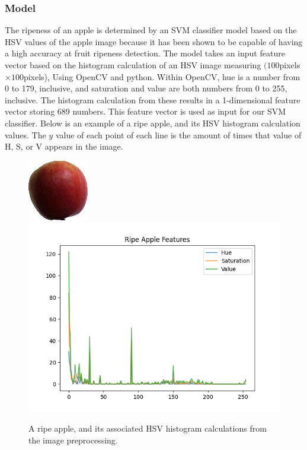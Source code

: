 \subsubsection{Model}
The ripeness of an apple is determined by an SVM classifier model based on the HSV values of the apple image because it has been shown to be capable of having a high accuracy at fruit ripeness detection\cite{HSVRipeness}.
The model takes an input feature vector based on the histogram calculation of an HSV image measuring $(100$pixels$\times100$pixels), Using OpenCV and python.
Within OpenCV, hue is a number from 0 to 179, inclusive, and saturation and value are both numbers from 0 to 255, inclusive.
The histogram calculation from these results in a 1-dimensional feature vector storing 689 numbers. 
This feature vector is used as input for our SVM classifier. Below is an example of a ripe apple, and its HSV histogram calculation values. The $y$ value of each point of each line is the amount of times that value of H, S, or V appears in the image.\\
\begin{figure}[!htb]
    \fontsize{7}{5}\selectfont
    \centering
    \includegraphics[scale=0.8]
    {figures/Ripe Apple Example.jpg}
    \includegraphics[scale=.5]
    {figures/ripeness_features.png}
    \label{Ripe Apple Example}
    \caption{
        A ripe apple, and its associated HSV histogram calculations from the image preprocessing.
    }
\end{figure}

